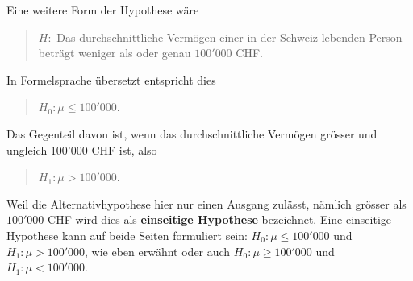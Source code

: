 \documentclass[
]{book}
\theoremstyle{definition}
\theoremstyle{definition}
\theoremstyle{definition}
\theoremstyle{definition}
\theoremstyle{remark}
\begin{document}
Eine weitere Form der Hypothese wäre

\begin{quote}
\(H:\) Das durchschnittliche Vermögen einer in der Schweiz lebenden Person beträgt weniger als oder genau \(100'000\) CHF.
\end{quote}

In Formelsprache übersetzt entspricht dies

\begin{quote}
\(H_0: \mu \leq 100'000\).
\end{quote}

Das Gegenteil davon ist, wenn das durchschnittliche Vermögen grösser und ungleich 100'000 CHF ist, also

\begin{quote}
\(H_1: \mu > 100'000\).
\end{quote}

\label{customdef-einseitige-hypothese}{Weil die Alternativhypothese hier nur einen Ausgang zulässt, nämlich grösser als \(100'000\) CHF wird dies als \textbf{einseitige Hypothese} bezeichnet. Eine einseitige Hypothese kann auf beide Seiten formuliert sein: \(H_0:\mu \leq 100'000\) und \(H_1: \mu > 100'000\), wie eben erwähnt oder auch \(H_0:\mu \geq 100'000\) und \(H_1: \mu < 100'000\).}
\end{document}
